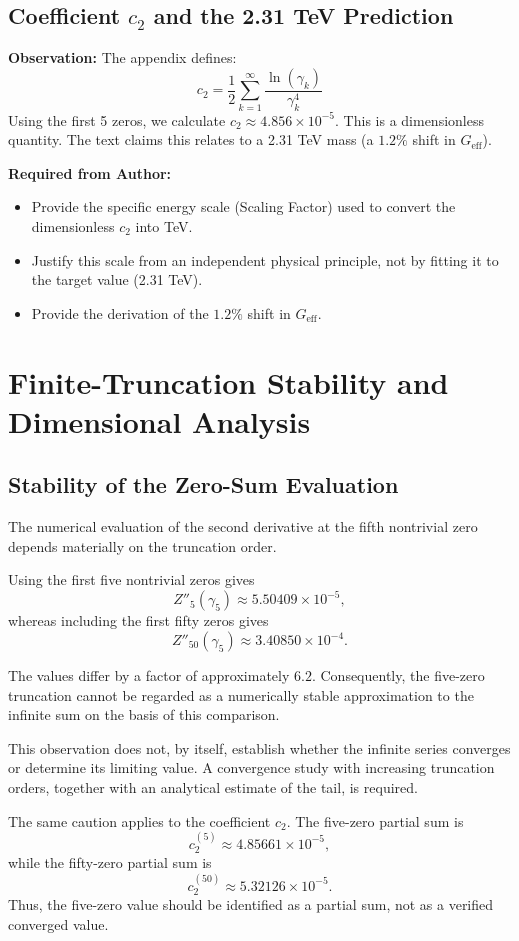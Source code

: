 \documentclass[11pt,a4paper]{article}
\begin{document}
\subsection{Coefficient $c_2$ and the 2.31 TeV Prediction}
\textbf{Observation:} The appendix defines:
\[
    c_2 = \frac{1}{2}\sum_{k=1}^{\infty}\frac{\ln(\gamma_k)}{\gamma_k^4}
\]
Using the first 5 zeros, we calculate $c_2 \approx 4.856 \times 10^{-5}$. This is a dimensionless quantity. The text claims this relates to a 2.31 TeV mass (a $1.2\%$ shift in $G_{\text{eff}}$).

\textbf{Required from Author:}
\begin{itemize}
    \item Provide the specific energy scale (Scaling Factor) used to convert the dimensionless $c_2$ into TeV.
    \item Justify this scale from an independent physical principle, not by fitting it to the target value (2.31 TeV).
    \item Provide the derivation of the $1.2\%$ shift in $G_{\text{eff}}$.
\end{itemize}

\section{Finite-Truncation Stability and Dimensional Analysis}

\subsection{Stability of the Zero-Sum Evaluation}
The numerical evaluation of the second derivative at the fifth nontrivial zero depends materially on the truncation order.

Using the first five nontrivial zeros gives
\[
    Z''_{5}(\gamma_5) \approx 5.50409\times10^{-5},
\]
whereas including the first fifty zeros gives
\[
    Z''_{50}(\gamma_5) \approx 3.40850\times10^{-4}.
\]

The values differ by a factor of approximately $6.2$.
Consequently, the five-zero truncation cannot be regarded as a numerically stable approximation to the infinite sum on the basis of this comparison.

This observation does not, by itself, establish whether the infinite series converges or determine its limiting value. A convergence study with increasing truncation orders, together with an analytical estimate of the tail, is required.

The same caution applies to the coefficient $c_2$. The five-zero partial sum is
\[
    c_2^{(5)}\approx4.85661\times10^{-5},
\]
while the fifty-zero partial sum is
\[
    c_2^{(50)}\approx5.32126\times10^{-5}.
\]
Thus, the five-zero value should be identified as a partial sum, not as a verified converged value.
\end{document}
